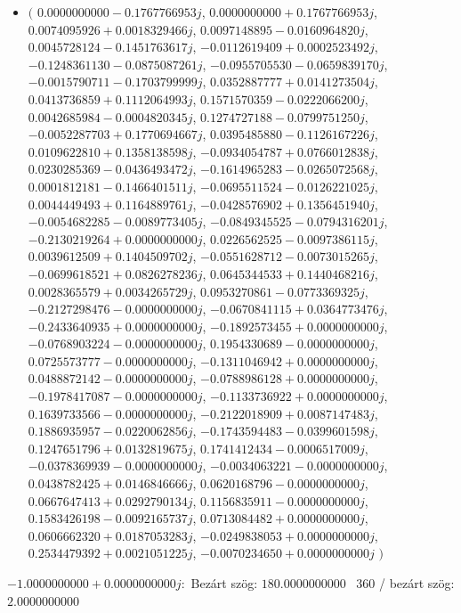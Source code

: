\documentclass[14pt,a4paper]{article}
\begin{document}
\begin{itemize}
\item
$\big($
$0.0000000000-0.1767766953j$, $0.0000000000+0.1767766953j$, $0.0074095926+0.0018329466j$, $0.0097148895-0.0160964820j$, $0.0045728124-0.1451763617j$, $-0.0112619409+0.0002523492j$, $-0.1248361130-0.0875087261j$, $-0.0955705530-0.0659839170j$, $-0.0015790711-0.1703799999j$, $0.0352887777+0.0141273504j$, $0.0413736859+0.1112064993j$, $0.1571570359-0.0222066200j$, $0.0042685984-0.0004820345j$, $0.1274727188-0.0799751250j$, $-0.0052287703+0.1770694667j$, $0.0395485880-0.1126167226j$, $0.0109622810+0.1358138598j$, $-0.0934054787+0.0766012838j$, $0.0230285369-0.0436493472j$, $-0.1614965283-0.0265072568j$, $0.0001812181-0.1466401511j$, $-0.0695511524-0.0126221025j$, $0.0044449493+0.1164889761j$, $-0.0428576902+0.1356451940j$, $-0.0054682285-0.0089773405j$, $-0.0849345525-0.0794316201j$, $-0.2130219264+0.0000000000j$, $0.0226562525-0.0097386115j$, $0.0039612509+0.1404509702j$, $-0.0551628712-0.0073015265j$, $-0.0699618521+0.0826278236j$, $0.0645344533+0.1440468216j$, $0.0028365579+0.0034265729j$, $0.0953270861-0.0773369325j$, $-0.2127298476-0.0000000000j$, $-0.0670841115+0.0364773476j$, $-0.2433640935+0.0000000000j$, $-0.1892573455+0.0000000000j$, $-0.0768903224-0.0000000000j$, $0.1954330689-0.0000000000j$, $0.0725573777-0.0000000000j$, $-0.1311046942+0.0000000000j$, $0.0488872142-0.0000000000j$, $-0.0788986128+0.0000000000j$, $-0.1978417087-0.0000000000j$, $-0.1133736922+0.0000000000j$, $0.1639733566-0.0000000000j$, $-0.2122018909+0.0087147483j$, $0.1886935957-0.0220062856j$, $-0.1743594483-0.0399601598j$, $0.1247651796+0.0132819675j$, $0.1741412434-0.0006517009j$, $-0.0378369939-0.0000000000j$, $-0.0034063221-0.0000000000j$, $0.0438782425+0.0146846666j$, $0.0620168796-0.0000000000j$, $0.0667647413+0.0292790134j$, $0.1156835911-0.0000000000j$, $0.1583426198-0.0092165737j$, $0.0713084482+0.0000000000j$, $0.0606662320+0.0187053283j$, $-0.0249838053+0.0000000000j$, $0.2534479392+0.0021051225j$, $-0.0070234650+0.0000000000j$
$\big)$
\end{itemize}
$-1.0000000000+0.0000000000j$:\
Bezárt szög: $180.0000000000$ \
360 / bezárt szög: $2.0000000000$\
\end{document}
